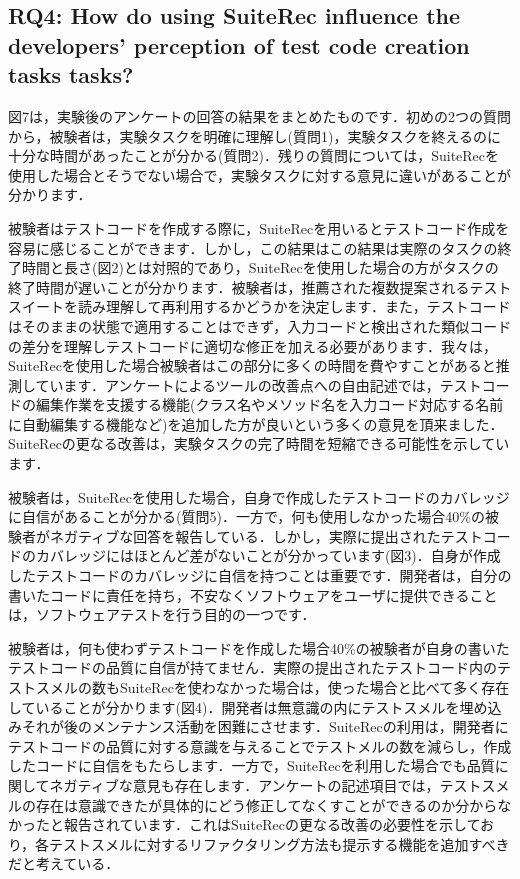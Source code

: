 \documentclass[conference]{IEEEtran}
\begin{document}
\subsection{RQ4: How do using SuiteRec influence the developers’ perception of test code creation tasks tasks?}

図7は，実験後のアンケートの回答の結果をまとめたものです．初めの2つの質問から，被験者は，実験タスクを明確に理解し(質問1)，実験タスクを終えるのに十分な時間があったことが分かる(質問2)．残りの質問については，SuiteRecを使用した場合とそうでない場合で，実験タスクに対する意見に違いがあることが分かります．

被験者はテストコードを作成する際に，SuiteRecを用いるとテストコード作成を容易に感じることができます．しかし，この結果はこの結果は実際のタスクの終了時間と長さ(図2)とは対照的であり，SuiteRecを使用した場合の方がタスクの終了時間が遅いことが分かります．被験者は，推薦された複数提案されるテストスイートを読み理解して再利用するかどうかを決定します．また，テストコードはそのままの状態で適用することはできず，入力コードと検出された類似コードの差分を理解しテストコードに適切な修正を加える必要があります．我々は，SuiteRecを使用した場合被験者はこの部分に多くの時間を費やすことがあると推測しています．アンケートによるツールの改善点への自由記述では，テストコードの編集作業を支援する機能(クラス名やメソッド名を入力コード対応する名前に自動編集する機能など)を追加した方が良いという多くの意見を頂来ました．SuiteRecの更なる改善は，実験タスクの完了時間を短縮できる可能性を示しています．

被験者は，SuiteRecを使用した場合，自身で作成したテストコードのカバレッジに自信があることが分かる(質問5)．一方で，何も使用しなかった場合40\%の被験者がネガティブな回答を報告している．しかし，実際に提出されたテストコードのカバレッジにはほとんど差がないことが分かっています(図3)．自身が作成したテストコードのカバレッジに自信を持つことは重要です．開発者は，自分の書いたコードに責任を持ち，不安なくソフトウェアをユーザに提供できることは，ソフトウェアテストを行う目的の一つです．

被験者は，何も使わずテストコードを作成した場合40\%の被験者が自身の書いたテストコードの品質に自信が持てません．実際の提出されたテストコード内のテストスメルの数もSuiteRecを使わなかった場合は，使った場合と比べて多く存在していることが分かります(図4)．開発者は無意識の内にテストスメルを埋め込みそれが後のメンテナンス活動を困難にさせます．SuiteRecの利用は，開発者にテストコードの品質に対する意識を与えることでテストメルの数を減らし，作成したコードに自信をもたらします．一方で，SuiteRecを利用した場合でも品質に関してネガティブな意見も存在します．アンケートの記述項目では，テストスメルの存在は意識できたが具体的にどう修正してなくすことができるのか分からなかったと報告されています．これはSuiteRecの更なる改善の必要性を示しており，各テストスメルに対するリファクタリング方法も提示する機能を追加すべきだと考えている．
\end{document}
